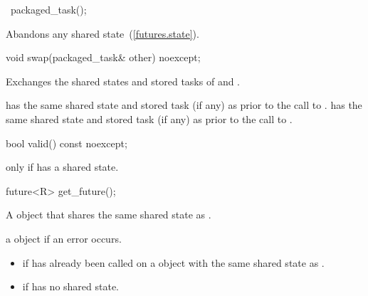 %
\begin{itemdecl}
~packaged_task();
\end{itemdecl}

\begin{itemdescr}
\pnum
\effects
Abandons any shared state~(\ref{futures.state}).
\end{itemdescr}

%
%
\begin{itemdecl}
void swap(packaged_task& other) noexcept;
\end{itemdecl}

\begin{itemdescr}
\pnum
\effects Exchanges the shared states and stored tasks of  and .

\pnum
\postcondition {} has the same shared state
and stored task (if any) as 
prior to the call to .  has the same shared state
and stored task (if any)
as  prior to the call to .
\end{itemdescr}

%
%
\begin{itemdecl}
bool valid() const noexcept;
\end{itemdecl}

\begin{itemdescr}
\pnum
\returns {} only if  has a shared state.
\end{itemdescr}

%
%
\begin{itemdecl}
future<R> get_future();
\end{itemdecl}

\begin{itemdescr}
\pnum
\returns A  object that shares the same shared state as .

\pnum
\throws a  object if an error occurs.

\pnum
\errors
\begin{itemize}
\item {} if  has already been called on
a  object with the same shared state as .
\item {} if  has no shared state.
\end{itemize}
\end{itemdescr}


